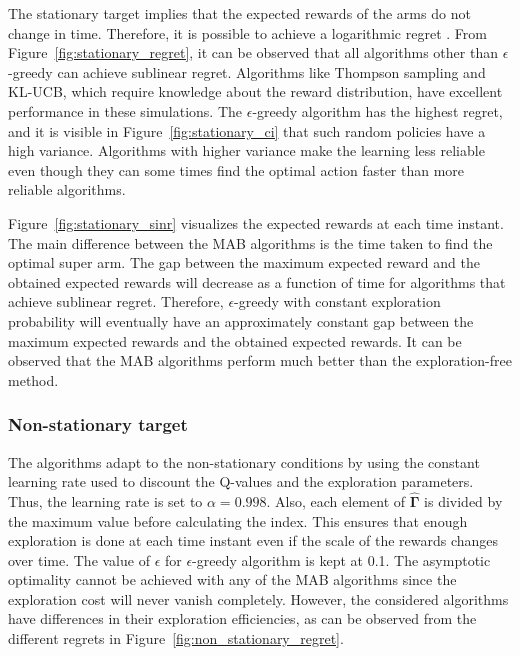 \documentclass[english, 12pt, a4paper, elec, utf8, a-1b, online]{aaltothesis}
\numberwithin{equation}{section}
\newcommand{\vsinrb}{\widehat{\boldsymbol{\Gamma}}}
\begin{document}
The stationary target implies that the expected rewards of the arms do not change in time.
Therefore, it is possible to achieve a logarithmic regret \cite{Lattimore2019}.
From Figure~\ref{fig:stationary_regret}, it can be observed that all algorithms other than $\epsilon$-greedy can achieve sublinear regret.
Algorithms like Thompson sampling and KL-UCB, which require knowledge about the reward distribution, have excellent performance in these simulations.
The $\epsilon$-greedy algorithm has the highest regret, and it is visible in Figure~\ref{fig:stationary_ci} that such random policies have a high variance.
Algorithms with higher variance make the learning less reliable even though they can some times find the optimal action faster than more reliable algorithms.

Figure~\ref{fig:stationary_sinr} visualizes the expected rewards at each time instant.
The main difference between the MAB algorithms is the time taken to find the optimal super arm.
The gap between the maximum expected reward and the obtained expected rewards will decrease as a function of time for algorithms that achieve sublinear regret.
Therefore, $\epsilon$-greedy with constant exploration probability will eventually have an approximately constant gap between the maximum expected rewards and the obtained expected rewards.
It can be observed that the MAB algorithms perform much better than the exploration-free method.

\subsubsection{Non-stationary target}

The algorithms adapt to the non-stationary conditions by using the constant learning rate used to discount the Q-values and the exploration parameters.
Thus, the learning rate is set to $\alpha = 0.998$.
Also, each element of $\vsinrb$ is divided by the maximum value before calculating the index.
This ensures that enough exploration is done at each time instant even if the scale of the rewards changes over time.
The value of $\epsilon$ for $\epsilon$-greedy algorithm is kept at 0.1.
The asymptotic optimality cannot be achieved with any of the MAB algorithms since the exploration cost will never vanish completely.
However, the considered algorithms have differences in their exploration efficiencies, as can be observed from the different regrets in Figure~\ref{fig:non_stationary_regret}.
\end{document}
